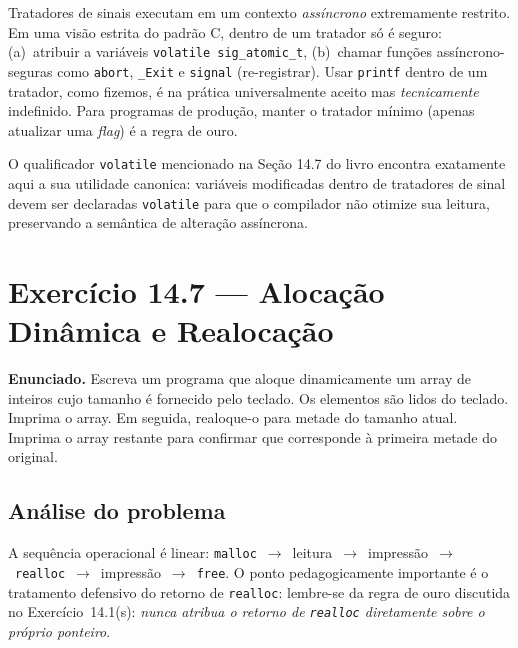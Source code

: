 \documentclass[11pt,a4paper]{article}
\begin{document}
\begin{errocomum}
Tratadores de sinais executam em um contexto \emph{ass\'incrono} extremamente restrito. Em uma vis\~ao estrita do padr\~ao C, dentro de um tratador s\'o \'e seguro: (a)~atribuir a vari\'aveis \texttt{volatile sig\_atomic\_t}, (b)~chamar fun\c{c}\~oes ass\'incrono-seguras como \texttt{abort}, \texttt{\_Exit} e \texttt{signal} (re-registrar). Usar \texttt{printf} dentro de um tratador, como fizemos, \'e na pr\'atica universalmente aceito mas \emph{tecnicamente} indefinido. Para programas de produ\c{c}\~ao, manter o tratador m\'inimo (apenas atualizar uma \emph{flag}) \'e a regra de ouro.
\end{errocomum}

\begin{obseng}
O qualificador \texttt{volatile} mencionado na Se\c{c}\~ao 14.7 do livro encontra exatamente aqui a sua utilidade canonica: vari\'aveis modificadas dentro de tratadores de sinal devem ser declaradas \texttt{volatile} para que o compilador n\~ao otimize sua leitura, preservando a sem\^antica de altera\c{c}\~ao ass\'incrona.
\end{obseng}

\newpage
\section{Exerc\'icio 14.7 --- Aloca\c{c}\~ao Din\^amica e Realoca\c{c}\~ao}

\begin{enunciado}
\textbf{Enunciado.} Escreva um programa que aloque dinamicamente um array de inteiros cujo tamanho \'e fornecido pelo teclado. Os elementos s\~ao lidos do teclado. Imprima o array. Em seguida, realoque-o para metade do tamanho atual. Imprima o array restante para confirmar que corresponde \`a primeira metade do original.
\end{enunciado}

\subsection*{An\'alise do problema}

A sequ\^encia operacional \'e linear: \texttt{malloc}~$\rightarrow$~leitura~$\rightarrow$~impress\~ao~$\rightarrow$~\texttt{realloc}~$\rightarrow$~impress\~ao~$\rightarrow$~\texttt{free}. O ponto pedagogicamente importante \'e o tratamento defensivo do retorno de \texttt{realloc}: lembre-se da regra de ouro discutida no Exerc\'icio~14.1(s): \emph{nunca atribua o retorno de \texttt{realloc} diretamente sobre o pr\'oprio ponteiro}.
\end{document}

